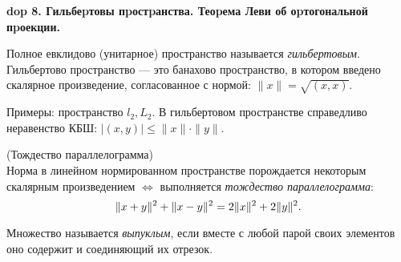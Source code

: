 \setcounter{section}{4}
\setcounter{subsection}{8}
\setcounter{equation}{0}
\textbf{\LARGE dop 8. Гильбеpтовы пpостpанства. Теоpема Леви об оpтогональной пpоекции.}

\begin{definition}
Полное евклидово (унитарное) пространство называется \emph{гильбертовым}. Гильбертово пространство --- это банахово пространство, в котором введено скалярное произведение, согласованное с нормой: $\|x\| = \sqrt{(x, x)}$.
\end{definition}

\begin{Commentwhite}
Примеры: пространство $l_2, L_2$. В гильбертовом пространстве справедливо неравенство КБШ: $|(x, y)|\le\|x\|\cdot\|y\|$.
\end{Commentwhite}

\begin{theorem}
(Тождество параллелограмма)\\
Норма в линейном нормированном пространстве порождается некоторым скалярным произведением $\Leftrightarrow$ выполняется \emph{тождество параллелограмма}:
\begin{equation}
    \label{тождество параллелограмма}
    \|x + y\|^2 + \|x - y\|^2 = 2\|x\|^2 + 2\|y\|^2.
\end{equation}
\end{theorem}

\begin{definition}
Множество называется \emph{выпуклым}, если вместе с любой парой своих элементов оно содержит и соединяющий их отрезок.
\end{definition}

